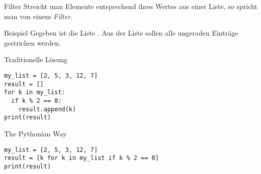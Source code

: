\begin{frame}
\begin{block}{Filter}
\vspace{2pt}
Streicht man Elemente entsprechend ihres Wertes aus einer Liste, so spricht man von einem \emph{Filter}. 
\end{block}

\pause 

\vspace{12pt}

\begin{exampleblock}{Beispiel}
\vspace{2pt}
Gegeben ist die Liste . Aus der Liste sollen alle ungeraden Einträge gestrichen werden. 
\end{exampleblock}

\end{frame}

\begin{fragile}
\begin{overprint}

\begin{block}{Traditionelle Lösung}
\vspace{2pt}
\begin{verbatim}
my_list = [2, 5, 3, 12, 7]
result = []
for k in my_list: 
  if k % 2 == 0: 
    result.append(k)
print(result)
\end{verbatim}
\end{block}

\vspace{12pt}

\pause

\begin{block}{The Pythonian Way}
\vspace{2pt}
\begin{verbatim}
my_list = [2, 5, 3, 12, 7]
result = [k for k in my_list if k % 2 == 0]
print(result)
\end{verbatim}
\end{block}
\end{overprint}


\end{fragile}

